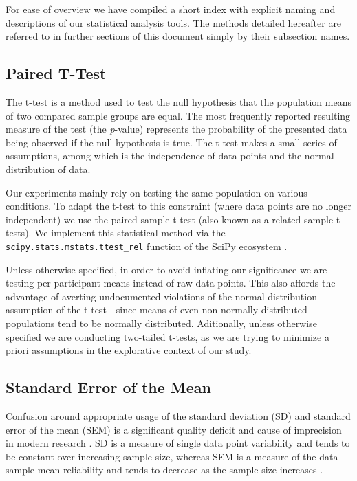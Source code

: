 	For ease of overview we have compiled a short index with explicit naming and descriptions of our statistical analysis tools.
	The methods detailed hereafter are referred to in further sections of this document simply by their subsection names.
	\subsection{Paired T-Test}\label{sec:m_sa_pt}
	    The t-test is a method used to test the null hypothesis that the population means of two compared sample groups are equal.
	    The most frequently reported resulting measure of the test (the \textit{p}-value) represents the probability of the presented data being observed if the null hypothesis is true. 
	    The t-test makes a small series of assumptions, among which is the independence of data points and the normal distribution of data.
	    
	    Our experiments mainly rely on testing the same population on various conditions.
	    To adapt the t-test to this constraint (where data points are no longer independent) we use the paired sample t-test (also known as a related sample t-tests).
	    We implement this statistical method via the \colorbox{vlg}{\texttt{scipy.stats.mstats.ttest\_rel}} function of the SciPy ecosystem \citep{scipy,Oliphant2007}.
	    
	    Unless otherwise specified, in order to avoid inflating our significance we are testing per-participant means instead of raw data points.
	    This also affords the advantage of averting undocumented violations of the normal distribution assumption of the t-test -
	    since means of even non-normally distributed populations tend to be normally distributed.
	    Aditionally, unless otherwise specified we are conducting two-tailed t-tests, as we are trying to minimize a priori assumptions in the explorative context of our study. 
	\subsection{Standard Error of the Mean}\label{sec:m_sa_se}
	    Confusion around appropriate usage of the standard deviation (SD) and standard error of the mean (SEM) is a significant quality deficit and cause of imprecision in modern research \citep{Nagele2003}.
	    SD is a measure of single data point variability and tends to be constant over increasing sample size, 
	    whereas SEM is a measure of the data sample mean reliability and tends to decrease as the sample size increases \citep{Altman2005,Streiner1996}.
	    
